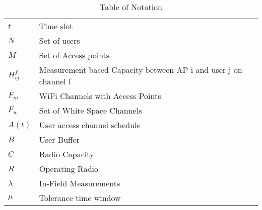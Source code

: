 \begin{table}[htbp]
\begin{center}%
\begin{tabular}{l l p{10cm} }
\toprule
$t$ & Time slot\\
$N$ & Set of users\\
$M$ & Set of Access points\\
$H_{ij}^f$ & Measurement based Capacity between AP i and user j on channel f\\
$F_{m}$ & WiFi Channels with Access Points\\
$F_{w}$ & Set of White Space Channels\\
$A(t)$ & User access channel schedule\\
$B$ & User Buffer\\
$C$ & Radio Capacity\\
$R$ & Operating Radio\\
$\lambda$ & In-Field Measurements\\
$\mu$ & Tolerance time window \\
\bottomrule
\end{tabular}
\end{center}
\caption{Table of Notation}
\label{tab:notation}
\end{table}
